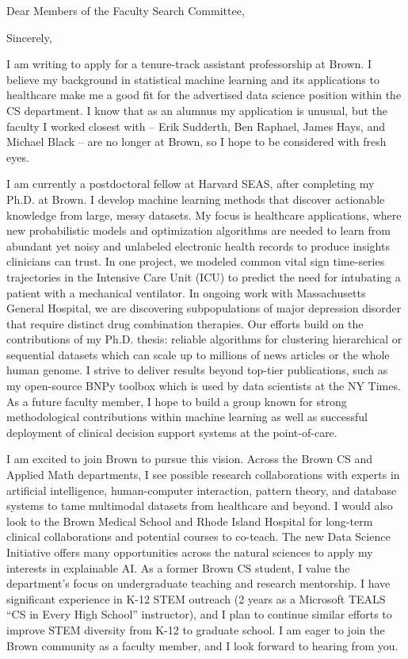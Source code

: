 \documentclass[11pt,letterpaper,roman]{moderncv}        %
\begin{document}
\date{\today}
\opening{Dear Members of the Faculty Search Committee,}
\closing{Sincerely,}

\makelettertitle

I am writing to apply for a tenure-track assistant professorship at Brown. I believe my background in statistical machine learning and its applications to healthcare make me a good fit for the advertised data science position within the CS department. I know that as an alumnus my application is unusual, but the faculty I worked closest with -- Erik Sudderth, Ben Raphael, James Hays, and Michael Black -- are no longer at Brown, so I hope to be considered with fresh eyes.

I am currently a postdoctoral fellow at Harvard SEAS, after completing my Ph.D. at Brown.
I develop machine learning methods
that discover actionable knowledge from large, messy datasets. 
My focus is healthcare applications, where new probabilistic models and optimization algorithms are needed to learn from abundant yet noisy and unlabeled electronic health records to produce insights clinicians can trust.
In one project, we modeled common vital sign time-series trajectories in the Intensive Care Unit (ICU) to predict the need for intubating a patient with a mechanical ventilator. In ongoing work with Massachusetts General Hospital, we are discovering subpopulations of major depression disorder that require distinct drug combination therapies. Our efforts build on the contributions of my Ph.D. thesis: reliable algorithms for clustering hierarchical or sequential datasets which can scale up to millions of news articles or the whole human genome.
I strive to deliver results beyond top-tier publications, such as my open-source BNPy toolbox which is used by data scientists at the NY Times. As a future faculty member, I hope to build a group known for strong methodological contributions within machine learning as well as successful deployment of clinical decision support systems at the point-of-care.

I am excited to join Brown to pursue this vision.
Across the Brown CS and Applied Math departments, I see possible research collaborations with experts in artificial intelligence, human-computer interaction, pattern theory, and database systems to tame 
multimodal datasets from healthcare and beyond. 
I would also look to the Brown Medical School and Rhode Island Hospital for long-term clinical collaborations and potential courses to co-teach. The new Data Science Initiative offers many opportunities across the natural sciences to apply my interests in explainable AI.
As a former Brown CS student, I value the department's focus on undergraduate teaching and research mentorship. 
I have significant experience in K-12 STEM outreach (2 years as a Microsoft TEALS ``CS in Every High School'' instructor), and I plan to continue similar efforts to improve STEM diversity from K-12 to graduate school.
I am eager to join the Brown community as a faculty member, and I look forward to hearing from you.

\makeletterclosing
\end{document}
